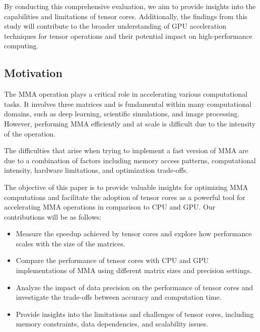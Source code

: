 \documentclass[conference]{IEEEtran}
\begin{document}
By conducting this comprehensive evaluation, we aim to provide insights into the capabilities and 
limitations of tensor cores. Additionally, the findings from this study will contribute to the 
broader understanding of GPU acceleration techniques for tensor operations and their potential 
impact on high-performance computing.

\subsection{Motivation}\label{sec:Motivation}

The MMA operation plays a critical role in accelerating various computational tasks.
It involves three matrices and is fundamental within many computational domains, 
such as deep learning, scientific simulations, and image processing. However, performing MMA 
efficiently and at scale is difficult due to the intensity of the operation. 

The difficulties that arise when trying to implement a fast version of MMA are due to 
a combination of factors including memory access patterns, 
computational intensity, hardware limitations, and optimization trade-offs.

The objective of this paper is to provide valuable insights for optimizing MMA computations
and facilitate the adoption of tensor cores as a powerful tool for accelerating MMA 
operations in comparison to CPU and GPU. Our contributions will be as follows:

\begin{itemize}
  \item Measure the speedup achieved by tensor cores and explore how 
  performance scales with the size of the matrices.

  \item Compare the performance of tensor cores with CPU and GPU implementations of MMA 
  using different matrix sizes and precision settings.
  
  \item Analyze the impact of data precision on the performance of tensor cores and 
  investigate the trade-offs between accuracy and computation time.
  
  \item Provide insights into the limitations and challenges of tensor cores, 
  including memory constraints, data dependencies, and scalability issues.
  
  \end{itemize}
  
\end{document}
